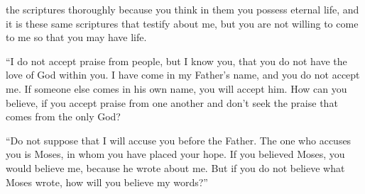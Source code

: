 {the scriptures
thoroughly because
you
think
in
them
you possess
eternal
life,
and
it is
these
same scriptures that testify
about
me,
but
you are
not
willing
to come
to
me
so that
you may have
life.
\par }{\PP {}“I do
not
accept
praise
from
people,
but
I know
you,
that
you do
not
have
the love
of God
within
you.
I
have come
in
my
Father’s
name,
and
you do
not
accept
me.
If
someone else
comes
in
his own
name,
you will accept
him.
How
can
you
believe,
if you accept
praise
from
one another
and
don’t
seek
the praise
that comes from
the only
God?
\par }{\PP {}“Do
not
suppose
that
I
will accuse
you
before
the Father.
The one who accuses
you
is
Moses,
in
whom
you have placed
your
hope.
If
you believed
Moses,
you would believe
me,
because
he
wrote
about
me.
But
if
you do
not
believe
what Moses
wrote,
how
will you believe
my
words?”

}
